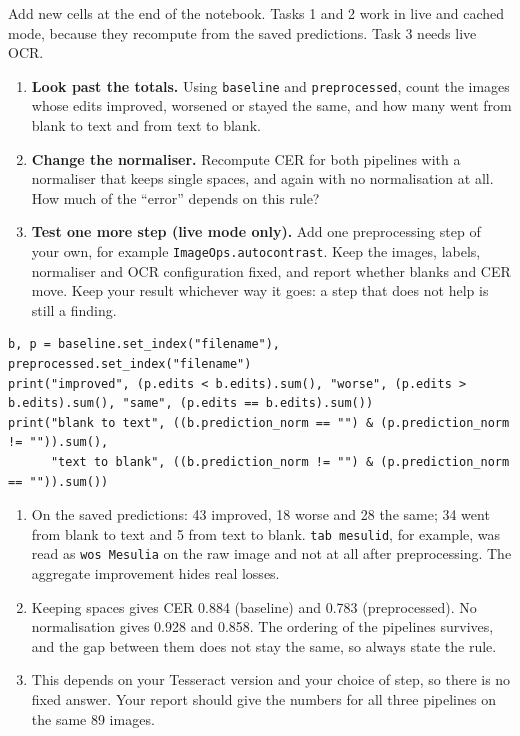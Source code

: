 \begin{yourturn}
Add new cells at the end of the notebook. Tasks 1 and 2 work in live and cached mode, because they recompute from the saved predictions. Task 3 needs live OCR.
\begin{enumerate}
  \item \textbf{Look past the totals.} Using \texttt{baseline} and \texttt{preprocessed}, count the images whose edits improved, worsened or stayed the same, and how many went from blank to text and from text to blank.
  \item \textbf{Change the normaliser.} Recompute CER for both pipelines with a normaliser that keeps single spaces, and again with no normalisation at all. How much of the ``error'' depends on this rule?
  \item \textbf{Test one more step (live mode only).} Add one preprocessing step of your own, for example \texttt{ImageOps.autocontrast}. Keep the images, labels, normaliser and OCR configuration fixed, and report whether blanks and CER move. Keep your result whichever way it goes: a step that does not help is still a finding.
\end{enumerate}
\begin{lstlisting}[style=utppython]
b, p = baseline.set_index("filename"), preprocessed.set_index("filename")
print("improved", (p.edits < b.edits).sum(), "worse", (p.edits > b.edits).sum(), "same", (p.edits == b.edits).sum())
print("blank to text", ((b.prediction_norm == "") & (p.prediction_norm != "")).sum(),
      "text to blank", ((b.prediction_norm != "") & (p.prediction_norm == "")).sum())
\end{lstlisting}
\end{yourturn}

\begin{expectedfindings}
\begin{enumerate}
  \item On the saved predictions: 43 improved, 18 worse and 28 the same; 34 went from blank to text and 5 from text to blank. \texttt{tab mesulid}, for example, was read as \texttt{wos Mesulia} on the raw image and not at all after preprocessing. The aggregate improvement hides real losses.
  \item Keeping spaces gives CER 0.884 (baseline) and 0.783 (preprocessed). No normalisation gives 0.928 and 0.858. The ordering of the pipelines survives, and the gap between them does not stay the same, so always state the rule.
  \item This depends on your Tesseract version and your choice of step, so there is no fixed answer. Your report should give the numbers for all three pipelines on the same 89 images.
\end{enumerate}
\end{expectedfindings}

